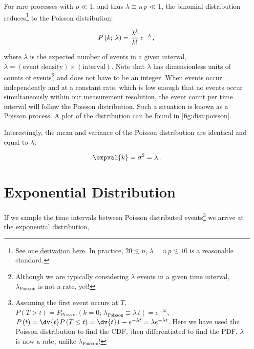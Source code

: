 For rare processes with $p \ll 1$, and thus $\lambda \equiv n\,p \ll 1$,
the binomial distribution reduces\footnote{See
one \href{https://medium.com/@andrew.chamberlain/deriving-the-poisson-distribution-from-the-binomial-distribution-840cc1668239}{derivation here}.
In practice, $\num{20} \lesssim n$, $\lambda = n\,p \lesssim \num{10}$ is a reasonable standard.} to the
Poisson distribution:

\begin{equation}\label{eq:stats:poisson:P}
P\left(k;\,\lambda\right) = \frac{\lambda^{k}}{k!}\,e^{-\lambda}\,, \\
\end{equation}

\noindent where $\lambda$ is the expected number of events in a given interval,
$\lambda = \left(\text{event density}\right) \times \left(\text{interval}\right)$.
Note that $\lambda$ has dimensionless units of counts of events\footnote{Although
we are typically considering $\lambda$ events in a given time interval,
$\lambda_{\text{Poisson}}$ is not a rate, yet!} and does not have to be an integer.
When events occur independently and at a constant rate,
which is low enough that no events occur simultaneously within our measurement resolution,
the event count per time interval will follow the Poisson distribution.
Such a situation is known as a Poisson process.
A plot of the distribution can be found in \cref{fig:dist:poisson}.

Interestingly, the mean and variance of the Poisson distribution are identical and equal to $\lambda$:

\begin{equation}\label{eq:stats:poisson:mean_variance}
\expval{k} = \sigma^{2} = \lambda\,.
\end{equation}

\section{Exponential Distribution}
\label{stats:exp}

If we sample the time intervals between Poisson distributed events\footnote{Assuming the first event occurs at $T$,
$P\left(T > t\right) = P_{\text{Poisson}}\left(k=0;\,\lambda_{\text{Poisson}} \equiv \lambda\,t\right) = e^{-\lambda t}$,
$P\left(t\right) = \dv{t} P\left(T \leq t\right) = \dv{t} 1 - e^{-\lambda t} = \lambda e^{-\lambda t}$.
Here we have used the Poisson distribution to find the CDF,
then differentiated to find the PDF.
$\lambda$ is now a rate, unlike $\lambda_{\text{Poisson}}$!} we
arrive at the exponential distribution,

